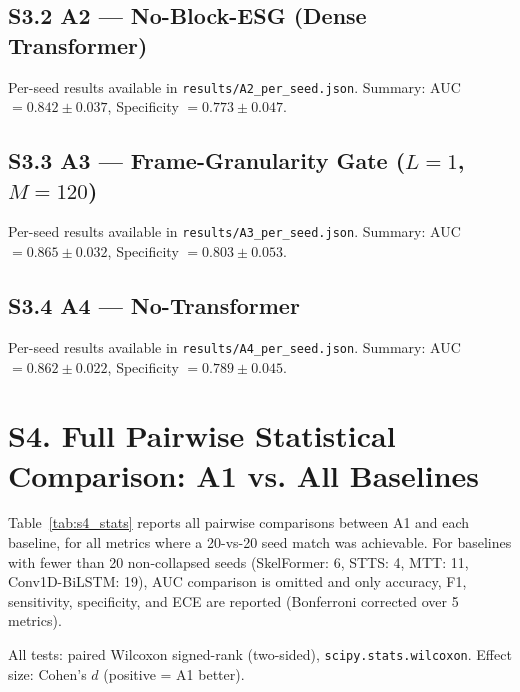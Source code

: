 \documentclass[12pt,a4paper]{article}
\begin{document}
\subsection{S3.2 A2 --- No-Block-ESG (Dense Transformer)}

Per-seed results available in \texttt{results/A2\_per\_seed.json}.
Summary: AUC $= 0.842 \pm 0.037$, Specificity $= 0.773 \pm 0.047$.

\subsection{S3.3 A3 --- Frame-Granularity Gate ($L=1$, $M=120$)}

Per-seed results available in \texttt{results/A3\_per\_seed.json}.
Summary: AUC $= 0.865 \pm 0.032$, Specificity $= 0.803 \pm 0.053$.

\subsection{S3.4 A4 --- No-Transformer}

Per-seed results available in \texttt{results/A4\_per\_seed.json}.
Summary: AUC $= 0.862 \pm 0.022$, Specificity $= 0.789 \pm 0.045$.

\section{S4. Full Pairwise Statistical Comparison: A1 vs. All Baselines}
\label{sec:s4}

Table~\ref{tab:s4_stats} reports all pairwise comparisons between A1 and
each baseline, for all metrics where a 20-vs-20 seed match was achievable.
For baselines with fewer than 20 non-collapsed seeds
(SkelFormer: 6, STTS: 4, MTT: 11, Conv1D-BiLSTM: 19),
AUC comparison is omitted and only accuracy, F1, sensitivity, specificity,
and ECE are reported (Bonferroni corrected over 5 metrics).

All tests: paired Wilcoxon signed-rank (two-sided), \texttt{scipy.stats.wilcoxon}.
Effect size: Cohen's $d$ (positive = A1 better).
\end{document}

